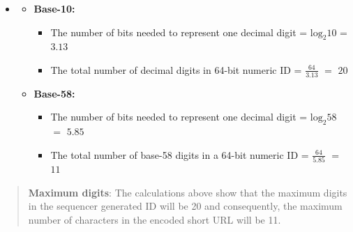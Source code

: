 \begin{itemize}
\item
\begin{itemize}
\item
\protect{}\label{kqhs_nkDWh6kJ7DcKPGrM}
\textbf{Base-10:}

\begin{itemize}
\item
\protect{}\label{juWE_hyOGAFu5aOVoPAuP}
The number of bits needed to represent one decimal digit = \protect{}\label{katex_inline_pCToVsgxH9fsAc48aggwd}{{{\(\text{log}_2{10}\)}}} = \protect{}\label{katex_inline_-bml2CWk4BSPXmz9SuBwe}{{{\(3.13\)}}}
\item
\protect{}\label{j4ZleYqsWumCyt0O_CD2y}
The total number of decimal digits in 64-bit numeric ID = \protect{}\label{katex_inline_tWNLkKl5zGyT5KJyKNf8s}{{{\(\frac{64}{3.13}\)}}} \protect{}\label{katex_inline_30GTOlld0FozlHiNll9Gq}{{{\(=\)}}} \protect{}\label{katex_inline_WME1epXBVeaXadATyKRwJ}{{{\(20\)}}}
\end{itemize}
\item
\protect{}\label{TkfXW7SCSSqIa_W32993A}
\textbf{Base-58:}

\begin{itemize}
\item
\protect{}\label{cDeSgzfUGDHt02wIl5xzk}
The number of bits needed to represent one decimal digit = \protect{}\label{katex_inline_dc4Ed-y1SrkxjynfWTuIc}{{{\(\text{log}_2{5}8\)}}} \protect{}\label{katex_inline_-OonFjRmjZrSRmE5cz3eu}{{{\(=\)}}} \protect{}\label{katex_inline_Pv1pdmpqlf4tQJFXdHu-q}{{{\(5.85\)}}}
\item
\protect{}\label{ifdnwFYErKE6d-tG_JySU}
The total number of base-58 digits in a 64-bit numeric ID = \protect{}\label{katex_inline_fWV3Zs0fVHKM642Lhb6PE}{{{\(\frac{64}{5.85}\)}}} \protect{}\label{katex_inline_PPcYgPNeCR8bcj83tzazA}{{{\(=\)}}} \protect{}\label{katex_inline_tl2XgC3xSHT3WULi6GDnC}{{{\(11\)}}}
\end{itemize}
\end{itemize}
\end{itemize}
\begin{quote}
\textbf{Maximum digits}: The calculations above show that the maximum digits in the sequencer generated ID will be 20 and consequently, the maximum number of characters in the encoded short URL will be 11. 
\end{quote}

